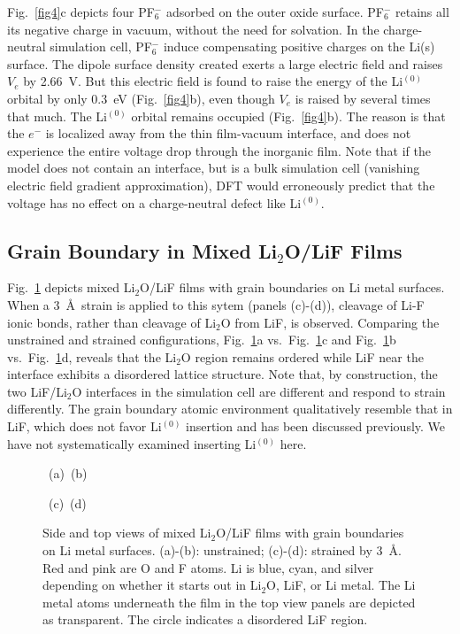 \documentclass[prb,preprint,amsmath,amssymb]{revtex4}
\begin{document}
Fig.~\ref{fig4}c depicts four PF$_6^-$ adsorbed on the outer oxide surface.
PF$_6^-$ retains all its negative charge in vacuum, without the need for
solvation.  In the charge-neutral simulation cell, PF$_6^-$ induce
compensating positive charges on the Li(s) surface.  The dipole surface
density created exerts a large electric field and raises $V_e$ by
2.66~V.\cite{solid}  But this electric field is found to raise the energy
of the Li$^{(0)}$ orbital by only 0.3~eV (Fig.~\ref{fig4}b), even though
$V_e$ is raised by several times that much.  The Li$^{(0)}$ orbital remains
occupied (Fig.~\ref{fig4}b).  The reason is that the $e^-$ is localized
away from the thin film-vacuum interface, and does not experience
the entire voltage drop through the inorganic film.  Note that if the model
does not contain an interface, but is a bulk simulation cell (vanishing
electric field gradient approximation), DFT would erroneously predict that
the voltage has no effect on a charge-neutral defect like Li$^{(0)}$.

\subsection*{Grain Boundary in Mixed Li$_2$O/LiF Films}

Fig.~\ref{fig5} depicts mixed Li$_2$O/LiF films with grain boundaries on
Li metal surfaces.  When a 3~\AA\, strain is applied to this sytem (panels
(c)-(d)), cleavage of Li-F ionic bonds, rather than cleavage of Li$_2$O from
LiF, is observed.  Comparing the unstrained and strained configurations,
Fig.~\ref{fig5}a vs.~Fig.~\ref{fig5}c and Fig.~\ref{fig5}b
vs.~Fig.~\ref{fig5}d, reveals that the Li$_2$O region remains ordered
while LiF near the interface exhibits a disordered lattice structure.
Note that, by construction, the two LiF/Li$_2$O interfaces in the simulation
cell are different and respond to strain differently.  The grain boundary
atomic environment qualitatively resemble that in LiF, which does not
favor Li$^{(0)}$ insertion and has been discussed previously.  We have not
systematically examined inserting Li$^{(0)}$ here.

\begin{figure}
\centerline{\hbox{ (a) \epsfxsize=2.20in 
                   \epsfxsize=2.20in  (b)}}
\centerline{\hbox{ (c) \epsfxsize=2.20in 
                   \epsfxsize=2.20in  (d)}}
\caption[]
{\label{fig5} \noindent
Side and top views of mixed Li$_2$O/LiF films with grain boundaries on
Li metal surfaces.  (a)-(b): unstrained; (c)-(d): strained by 3~\AA.
Red and pink are O and F atoms.  Li is blue, cyan, and silver depending
on whether it starts out in Li$_2$O, LiF, or Li metal.  The Li metal
atoms underneath the film in the top view panels are depicted as transparent.
The circle indicates a disordered LiF region.
}
\end{figure}
\end{document}
